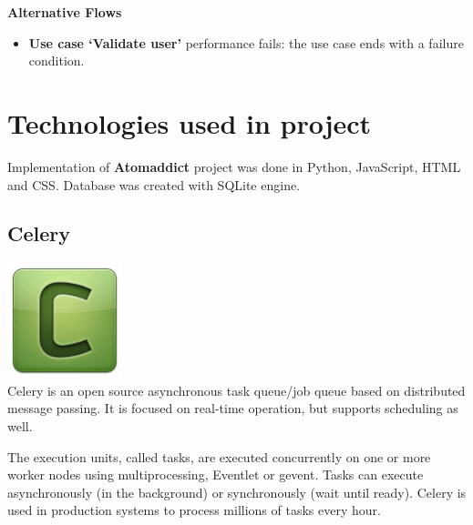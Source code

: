 \documentclass[12pt]{article}
\begin{document}
\vspace{0.5cm}


\textbf{Alternative Flows}

\begin{itemize}

    \item \textbf{Use case `Validate user'} performance fails: the use case ends with a failure condition.

\end{itemize}

\vspace{0.5cm}

\section{Technologies used in project}
Implementation of \textbf{Atomaddict} project was done in Python, JavaScript, HTML and CSS. Database was created with SQLite engine.

\subsection{Celery}

\includegraphics[width=0.25\textwidth]{images/celery.png} \\

Celery is an open source asynchronous task queue/job queue based on distributed message passing. It is focused on real-time operation, but supports scheduling as well.

The execution units, called tasks, are executed concurrently on one or more worker nodes using multiprocessing, Eventlet or gevent. Tasks can execute asynchronously (in the background) or synchronously (wait until ready). Celery is used in production systems to process millions of tasks every hour.
\end{document}
